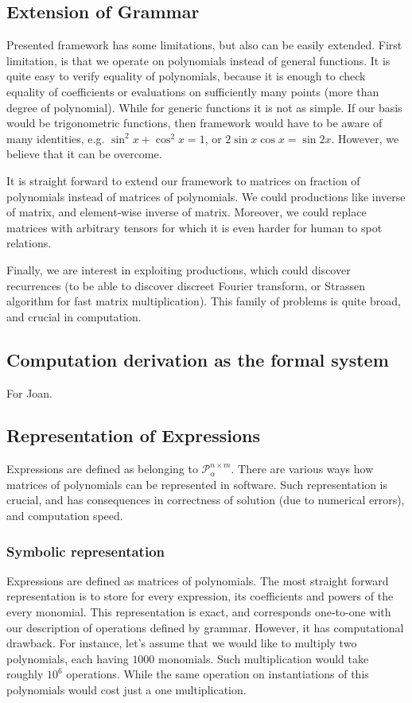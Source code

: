 \subsection{Extension of Grammar}
Presented framework has some limitations, but also can be easily extended. First limitation,
is that we operate on polynomials instead of general functions. It is quite easy to verify
equality of polynomials, because it is enough to check equality of coefficients or
evaluations on sufficiently many points (more than degree of polynomial). While for generic functions
it is not as simple. If our basis would be trigonometric functions, then 
framework would have to be aware of many identities, e.g. $\sin^2{x} + \cos^2{x} = 1$, or $2\sin x \cos x = \sin 2x$.
However, we believe that it can be overcome. 

It is straight forward to extend our framework to matrices on fraction of polynomials instead of matrices of polynomials.
We could productions like inverse of matrix, and element-wise inverse of matrix. 
Moreover, we could replace matrices with arbitrary tensors for which 
it is even harder for human to spot relations.


Finally, we are interest in exploiting productions, which could discover 
recurrences (to be able to discover discreet Fourier transform, or
Strassen algorithm for fast matrix multiplication). This family of problems is quite broad,
and crucial in computation.

\subsection{Computation derivation as the formal system}

For Joan.

\subsection{Representation of Expressions}

Expressions are defined as belonging to $\mathcal{P}^{n \times m}_\alpha$. There are various
ways how matrices of polynomials can be represented in software. Such representation is crucial, and has consequences in
 correctness of solution (due to numerical errors), and computation speed.


\subsubsection{Symbolic representation}
Expressions are defined as matrices of polynomials. The most straight forward 
representation is to store for every expression, its coefficients and powers of the every monomial.
This representation is exact, and corresponds one-to-one with our description of operations
defined by grammar. However, it has computational drawback. 
For instance, let's assume that we would like to multiply two polynomials, each having $1000$ monomials.
Such multiplication would take roughly $10^6$ operations. While the same operation on instantiations of
this polynomials would cost just a one multiplication.


